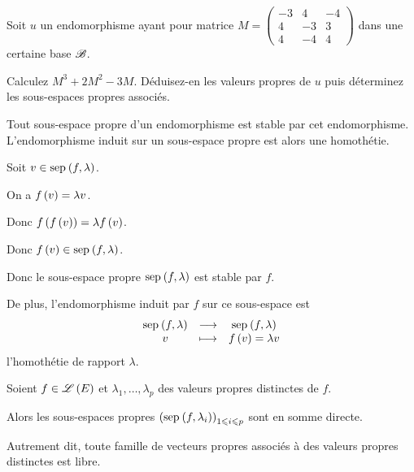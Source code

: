 \begin{exo}
Soit \(u\) un endomorphisme ayant pour matrice \(M=\begin{pmatrix}
-3 & 4 & -4 \\
4 & -3 & 3 \\
4 & -4 & 4
\end{pmatrix}\) dans une certaine base \(\mathscr{B}\).

Calculez \(M^3+2M^2-3M\). Déduisez-en les valeurs propres de \(u\) puis déterminez les sous-espaces propres associés.
\end{exo}

\begin{prop}
Tout sous-espace propre d'un endomorphisme est stable par cet endomorphisme. L'endomorphisme induit sur un sous-espace propre est alors une homothétie.
\end{prop}

\begin{dem}
Soit \(v\in\sep{f}{\lambda}\).

On a \(f\left(v\right)=\lambda v\).

Donc \(f\left(f\left(v\right)\right)=\lambda f\left(v\right)\).

Donc \(f\paren{v}\in\sep{f}{\lambda}\).

Donc le sous-espace propre \(\sep{f}{\lambda}\) est stable par \(f\).

De plus, l'endomorphisme induit par \(f\) sur ce sous-espace est \[\fonctionlambda{\sep{f}{\lambda}}{\sep{f}{\lambda}}{v}{f\paren{v}=\lambda v}\] \ie l'homothétie de rapport \(\lambda\).
\end{dem}

\begin{theo}
Soient \(f\in\mathscr{L}\left(E\right)\) et \(\lambda_1,\dots,\lambda_p\) des valeurs propres distinctes de \(f\).

Alors les sous-espaces propres \(\paren{\sep{f}{\lambda_i}}_{1\leq i\leq p}\) sont en somme directe.

Autrement dit, toute famille de vecteurs propres associés à des valeurs propres distinctes est libre.
\end{theo}


